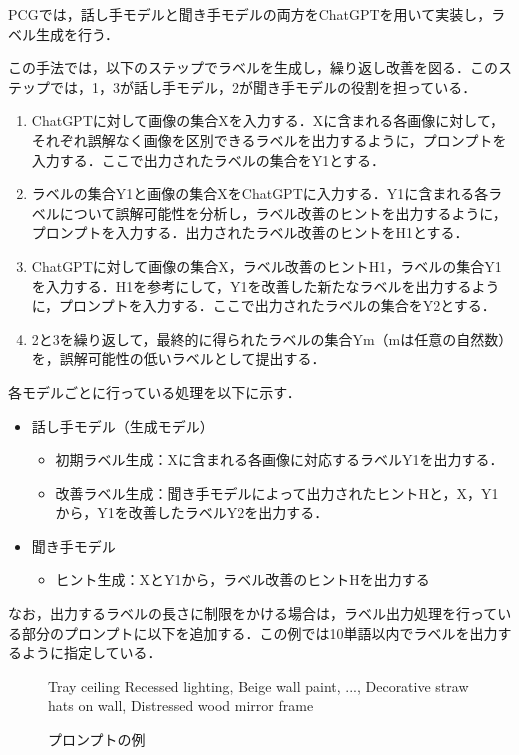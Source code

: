 \documentclass[a4paper,11pt]{jreport}
\begin{document}
PCGでは，話し手モデルと聞き手モデルの両方をChatGPTを用いて実装し，ラベル生成を行う．

この手法では，以下のステップでラベルを生成し，繰り返し改善を図る．このステップでは，1，3が話し手モデル，2が聞き手モデルの役割を担っている．

\begin{enumerate}
  \item ChatGPTに対して画像の集合Xを入力する．Xに含まれる各画像に対して，それぞれ誤解なく画像を区別できるラベルを出力するように，プロンプトを入力する．ここで出力されたラベルの集合をY1とする．
  \item ラベルの集合Y1と画像の集合XをChatGPTに入力する．Y1に含まれる各ラベルについて誤解可能性を分析し，ラベル改善のヒントを出力するように，プロンプトを入力する．出力されたラベル改善のヒントをH1とする．
  \item ChatGPTに対して画像の集合X，ラベル改善のヒントH1，ラベルの集合Y1を入力する．H1を参考にして，Y1を改善した新たなラベルを出力するように，プロンプトを入力する．ここで出力されたラベルの集合をY2とする．
  \item 2と3を繰り返して，最終的に得られたラベルの集合Ym（mは任意の自然数）を，誤解可能性の低いラベルとして提出する．
\end{enumerate}

各モデルごとに行っている処理を以下に示す．

\begin{itemize}
  \item 話し手モデル（生成モデル）
    \begin{itemize}
      \item 初期ラベル生成：Xに含まれる各画像に対応するラベルY1を出力する．
      \item 改善ラベル生成：聞き手モデルによって出力されたヒントHと，X，Y1から，Y1を改善したラベルY2を出力する．
    \end{itemize}
  \item 聞き手モデル
    \begin{itemize}
      \item ヒント生成：XとY1から，ラベル改善のヒントHを出力する
    \end{itemize}
\end{itemize}

なお，出力するラベルの長さに制限をかける場合は，ラベル出力処理を行っている部分のプロンプトに以下を追加する．この例では10単語以内でラベルを出力するように指定している．

\begin{figure}[H]
	\begin{mdframed}[linewidth=1pt]
	Tray ceiling Recessed lighting, Beige wall paint, ..., Decorative straw hats on wall, Distressed wood mirror frame
	\end{mdframed}
	\caption{プロンプトの例}
	\label{fig:baseline_prompt}
\end{figure}
	
\end{document}
